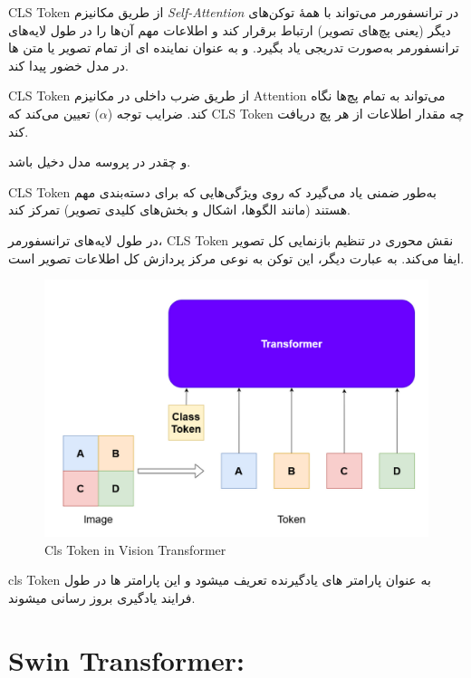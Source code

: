 CLS Token 
از طریق مکانیزم \textit{Self-Attention} در ترانسفورمر می‌تواند با همهٔ توکن‌های دیگر (یعنی پچ‌های تصویر) ارتباط برقرار کند و اطلاعات مهم آن‌ها را در طول لایه‌های ترانسفورمر به‌صورت تدریجی یاد بگیرد. و به عنوان نماینده ای از تمام تصویر یا متن ها در مدل خضور پیدا کند.

     CLS Token از طریق ضرب داخلی در مکانیزم Attention می‌تواند به تمام پچ‌ها نگاه کند. ضرایب توجه ($\alpha$) تعیین می‌کند که CLS Token چه مقدار اطلاعات از هر پچ دریافت کند.

و چقدر در پروسه مدل دخیل باشد.

     CLS Token به‌طور ضمنی یاد می‌گیرد که روی ویژگی‌هایی که برای دسته‌بندی مهم هستند (مانند الگوها، اشکال و بخش‌های کلیدی تصویر) تمرکز کند.


    در طول لایه‌های ترانسفورمر، CLS Token نقش محوری در تنظیم بازنمایی کل تصویر ایفا می‌کند. به عبارت دیگر، این توکن به نوعی مرکز پردازش کل اطلاعات تصویر است.
    
    
    \begin{figure}[h]
    	\centering
    	\begin{minipage}[b]{0.9\textwidth}
    		\centering
    		\includegraphics[width=\textwidth]{transformer_images/cls_token.png}
    		\caption{Cls Token in Vision Transformer}
    		\label{fig:Cls Token In Vision Transformer}
    	\end{minipage}
    	\hfill
    	
    \end{figure}
    
   cls Token 
   به عنوان پارامتر های یادگیرنده تعریف میشود و این پارامتر ها در طول فرایند یادگیری بروز رسانی میشوند.
   
   
\section{Swin Transformer:}




   
   
    
    
